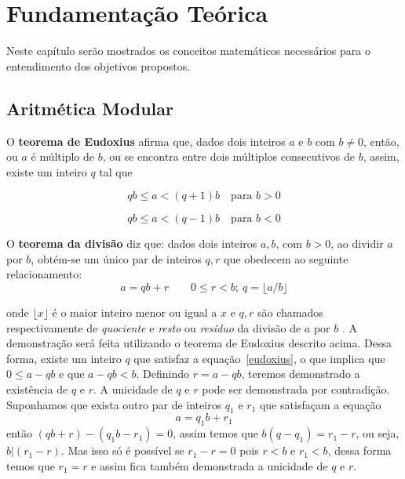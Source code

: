 \chapter{Fundamentação Teórica}
Neste capítulo serão mostrados os conceitos matemáticos necessários para o entendimento dos objetivos propostos.

%
%
\section{Aritmética Modular}

O \textbf{teorema de Eudoxius} afirma que, dados dois inteiros \(a\) e \(b\) com \(b \neq 0\), então, ou \(a\) é múltiplo de \(b\), ou se encontra entre dois múltiplos 
consecutivos de \(b\), assim, existe um inteiro \(q\) tal que\cite{Santos:2014}

\begin{equation} \label{eudoxius}
  qb \leq a < (q + 1)b\quad\mbox{para \(b > 0\)}
\end{equation}

\begin{equation}
  qb \leq a < (q - 1)b\quad\mbox{para \(b < 0\)}
\end{equation}

O \textbf{teorema da divisão} diz que: dados dois inteiros $a, b$, com $b > 0$, ao dividir \(a\) por \(b\), obtém-se um único par de inteiros $q, r$ que obedecem ao seguinte relacionamento:
\begin{equation}
  a=qb+r \qquad 0 \leq r<b;\ q=\lfloor a/b \rfloor
\end{equation}

onde $\lfloor x \rfloor$ é o maior inteiro menor ou igual a \(x\) e $q,r$ são chamados respectivamente de \textit{quociente} e \textit{resto} ou \textit{resíduo} da divisão de \(a\) por \(b\) \cite{Santos:2014}. A demonstração será feita utilizando o teorema de Eudoxius descrito acima. Dessa forma, existe um inteiro \(q\) que satisfaz a equação~\ref{eudoxius}, o que implica que \(0 \leq a - qb\) e que \(a - qb < b\). Definindo \(r = a - qb\), teremos demonstrado a existência de \(q\) e \(r\). A unicidade de \(q\) e 
\(r\) pode ser demonstrada por contradição. Suponhamos que exista outro par de inteiros \(q_1\) e \(r_1\) que satisfaçam a equação
\begin{equation}
  a = q_1b + r_1
\end{equation}
então \((qb + r) - (q_1b - r_1) = 0\), assim temos que \(b(q - q_1) = r_1 - r\), ou seja, \(b|(r_1 - r)\). Mas isso só é possível se \(r_1 - r = 0\) 
pois \(r < b\) e \(r_1 < b\), dessa forma temos que \(r_1 = r\) 
e assim fica também demonstrada a unicidade de \(q\) e \(r\).\cite{Santos:2014}


